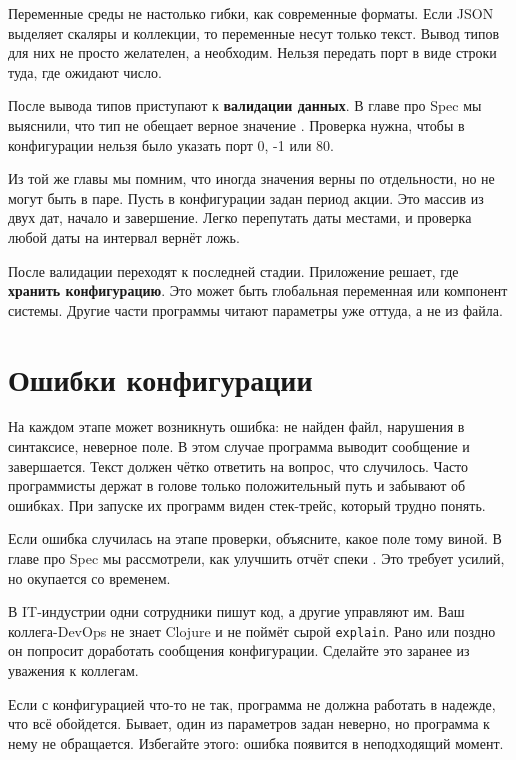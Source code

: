 Переменные среды не настолько гибки, как современные форматы. Если JSON выделяет
скаляры и коллекции, то переменные несут только текст. Вывод типов для них не
просто желателен, а необходим. Нельзя передать порт в виде строки туда, где
ожидают число.


После вывода типов приступают к \textbf{валидации данных}. В главе про Spec мы
выяснили, что тип не обещает верное значение .
Проверка нужна, чтобы в конфигурации нельзя было указать порт 0, -1 или 80.

Из той же главы мы помним, что иногда значения верны по отдельности, но не могут
быть в паре. Пусть в конфигурации задан период акции. Это массив из двух дат,
начало и завершение. Легко перепутать даты местами, и проверка любой даты
на интервал вернёт ложь.

После валидации переходят к последней стадии. Приложение решает, где
\textbf{хранить конфигурацию}. Это может быть глобальная переменная или
компонент системы. Другие части программы читают параметры уже оттуда, а не из
файла.

\section{Ошибки конфигурации}


На каждом этапе может возникнуть ошибка: не найден файл, нарушения в синтаксисе,
неверное поле. В этом случае программа выводит сообщение и завершается.
Текст должен чётко ответить на вопрос, что случилось. Часто программисты
держат в голове только положительный путь и забывают об ошибках. При запуске
их программ виден стек-трейс, который трудно понять.

Если ошибка случилась на этапе проверки, объясните, какое поле тому виной. В
главе про Spec мы рассмотрели, как улучшить отчёт спеки .
Это требует усилий, но окупается со временем.


В IT-индустрии одни сотрудники пишут код, а другие управляют им. Ваш
коллега-DevOps не знает Clojure и не поймёт сырой \verb|explain|. Рано или
поздно он попросит доработать сообщения конфигурации. Сделайте это заранее из
уважения к коллегам.

Если с конфигурацией что-то не так, программа не должна работать в надежде, что
всё обойдется. Бывает, один из параметров задан неверно, но программа к нему не
обращается. Избегайте этого: ошибка появится в неподходящий момент.

